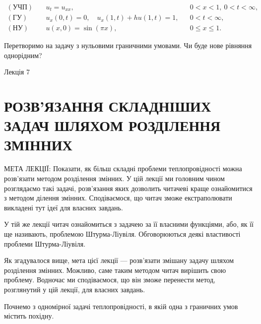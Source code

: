\documentclass[
  ukrainian,
]{article}
\begin{document}
\[
\begin{aligned}
(\text{УЧП})\quad & u_t = u_{xx}, && 0 < x < 1,\ 0 < t < \infty, \\
(\text{ГУ})\quad & u_x(0,t) = 0,\quad u_x(1,t) + h u(1,t) = 1, && 0 < t < \infty, \\
(\text{НУ})\quad & u(x,0) = \sin(\pi x), && 0 \leqslant x \leqslant 1.
\end{aligned}
\]

Перетворимо на задачу з нульовими граничними умовами. Чи буде нове
рівняння однорідним?

Лекція 7

\section{РОЗВ'ЯЗАННЯ СКЛАДНІШИХ ЗАДАЧ ШЛЯХОМ РОЗДІЛЕННЯ
ЗМІННИХ}\label{ux440ux43eux437ux432ux44fux437ux430ux43dux43dux44f-ux441ux43aux43bux430ux434ux43dux456ux448ux438ux445-ux437ux430ux434ux430ux447-ux448ux43bux44fux445ux43eux43c-ux440ux43eux437ux434ux456ux43bux435ux43dux43dux44f-ux437ux43cux456ux43dux43dux438ux445}

МЕТА ЛЕКЦІЇ: Показати, як більш складні проблеми теплопровідності можна
розв'язати методом розділення змінних. У цій лекції ми головним чином
розглядаємо такі задачі, розв'язання яких дозволить читачеві краще
ознайомитися з методом ділення змінних. Сподіваємося, що читач зможе
екстраполювати викладені тут ідеї для власних завдань.

У тій же лекції читач ознайомиться з задачею за її власними функціями,
або, як її ще називають, проблемою Штурма-Ліувіля. Обговорюються деякі
властивості проблеми Штурма-Ліувіля.

Як згадувалося вище, мета цієї лекції --- розв'язати змішану задачу
шляхом розділення змінних. Можливо, саме таким методом читач вирішить
свою проблему. Водночас ми сподіваємося, що він зможе перенести метод,
розглянутий у цій лекції, для власних завдань.

Почнемо з одномірної задачі теплопровідності, в якій одна з граничних
умов містить похідну.
\end{document}
